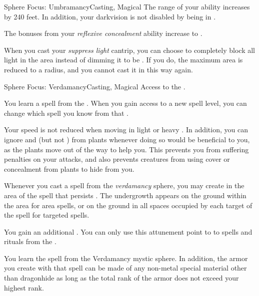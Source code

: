 \begin{feat}{Sphere Focus: Umbramancy}{Casting, Magical}
         The range of your  ability increases by 240 feet.
        In addition, your darkvision is not disabled by being in .

          The bonuses from your \textit{reflexive concealment} ability increase to .

         When you cast your \textit{suppress light} cantrip, you can choose to completely block all light in the area instead of dimming it to be .
        If you do, the maximum area is reduced to a \medarea radius, and you  cannot cast it in this way again.
    \end{feat}

    \begin{feat}{Sphere Focus: Verdamancy}{Casting, Magical}
        \featpre Access to the  .

         You learn a spell from the  .
        When you gain access to a new spell level, you can change which spell you know from that .

         Your speed is not reduced when moving in light or heavy .
        In addition, you can ignore  and  (but not ) from plants whenever doing so would be beneficial to you, as the plants move out of the way to help you.
        This prevents you from suffering penalties on your attacks, and also prevents creatures from using cover or concealment from plants to hide from you.

         Whenever you cast a spell from the \textit{verdamancy} sphere, you may create  in the area of the spell that persists .
        The undergrowth appears on the ground within the area for area spells, or on the ground in all spaces occupied by each target of the spell for targeted spells.

         You gain an additional .
        You can only use this attunement point to  to spells and rituals from the  .

         You learn the  spell from the Verdamancy mystic sphere.
        In addition, the armor you create with that spell can be made of any non-metal special material other than dragonhide as long as the total rank of the armor does not exceed your highest rank.


\end{feat}
